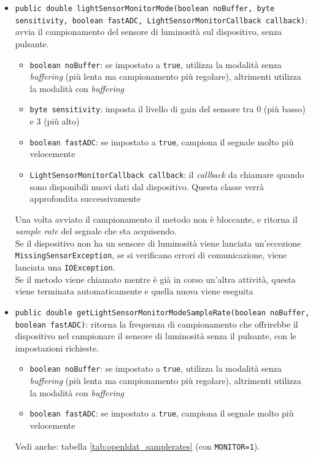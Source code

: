 \begin{itemize}
	\item \texttt{public double lightSensorMonitorMode(boolean noBuffer, byte sensitivity, boolean fastADC, LightSensorMonitorCallback callback)}: avvia il campionamento del sensore di luminosità sul dispositivo, senza pulsante.\begin{itemize}
		\item \texttt{boolean noBuffer}: se impostato a \texttt{true}, utilizza la modalità senza \textit{buffering} (più lenta ma campionamento più regolare), altrimenti utilizza la modalità con \textit{buffering}
		\item \texttt{byte sensitivity}: imposta il livello di gain del sensore tra 0 (più basso) e 3 (più alto)
		\item \texttt{boolean fastADC}: se impostato a \texttt{true}, campiona il segnale molto più velocemente
		\item \texttt{LightSensorMonitorCallback callback}: il \textit{callback} da chiamare quando sono disponibili nuovi dati dal dispositivo. Questa classe verrà approfondita successivamente
	\end{itemize}
	Una volta avviato il campionamento il metodo non è bloccante, e ritorna il \textit{sample rate} del segnale che sta acquisendo.\\
	Se il dispositivo non ha un sensore di luminosità viene lanciata un'eccezione \texttt{MissingSensorException}, se si verificano errori di comunicazione, viene lanciata una \texttt{IOException}.\\
	Se il metodo viene chiamato mentre è già in corso un'altra attività, questa viene terminata automaticamente e quella nuova viene eseguita
	\item \texttt{public double getLightSensorMonitorModeSampleRate(boolean noBuffer, boolean fastADC)}: ritorna la frequenza di campionamento che offrirebbe il dispositivo nel campionare il sensore di luminosità senza il pulsante, con le impostazioni richieste.\begin{itemize}
		\item \texttt{boolean noBuffer}: se impostato a \texttt{true}, utilizza la modalità senza \textit{buffering} (più lenta ma campionamento più regolare), altrimenti utilizza la modalità con \textit{buffering}
		\item \texttt{boolean fastADC}: se impostato a \texttt{true}, campiona il segnale molto più velocemente
	\end{itemize}
	Vedi anche: tabella \ref{tab:openldat_samplerates} (con \texttt{MONITOR=1}).\\

\end{itemize}
